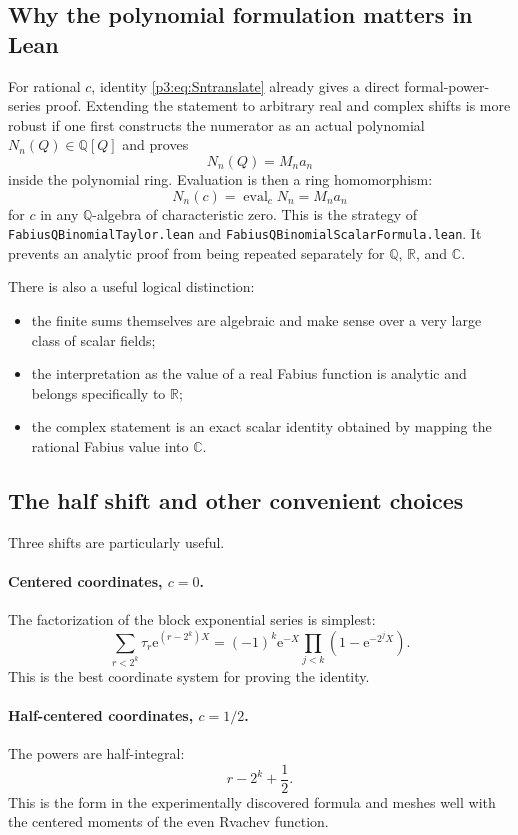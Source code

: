 \documentclass[11pt,oneside]{article}
\theoremstyle{definition}
\theoremstyle{remark}
\newcommand{\Q}{\mathbb Q}
\newcommand{\R}{\mathbb R}
\newcommand{\C}{\mathbb C}
\newcommand{\e}{\mathrm e}
\newcommand{\tm}{\tau}
\begin{document}
\subsection{Why the polynomial formulation matters in Lean}

For rational $c$, identity \eqref{p3:eq:Sntranslate} already gives a direct
formal-power-series proof.  Extending the statement to arbitrary real and
complex shifts is more robust if one first constructs the numerator as an
actual polynomial $N_n(Q)\in\Q[Q]$ and proves
\[
 N_n(Q)=M_na_n
\]
inside the polynomial ring.  Evaluation is then a ring homomorphism:
\[
 N_n(c)=\operatorname{eval}_c N_n=M_na_n
\]
for $c$ in any $\Q$-algebra of characteristic zero.  This is the strategy of
\texttt{FabiusQBinomialTaylor.lean} and
\texttt{FabiusQBinomialScalarFormula.lean}.  It prevents an analytic proof
from being repeated separately for $\Q$, $\R$, and $\C$.

There is also a useful logical distinction:
\begin{itemize}[leftmargin=2em]
\item the finite sums themselves are algebraic and make sense over a very
large class of scalar fields;
\item the interpretation as the value of a real Fabius function is analytic
and belongs specifically to $\R$;
\item the complex statement is an exact scalar identity obtained by mapping
the rational Fabius value into $\C$.
\end{itemize}

\subsection{The half shift and other convenient choices}

Three shifts are particularly useful.

\paragraph{Centered coordinates, $c=0$.}
The factorization of the block exponential series is simplest:
\[
 \sum_{r<2^k}\tm_r\e^{(r-2^k)X}
 =(-1)^k\e^{-X}\prod_{j<k}(1-\e^{-2^jX}).
\]
This is the best coordinate system for proving the identity.

\paragraph{Half-centered coordinates, $c=1/2$.}
The powers are half-integral:
\[
 r-2^k+\frac12.
\]
This is the form in the experimentally discovered formula and meshes well
with the centered moments of the even Rvachev function.
\end{document}
